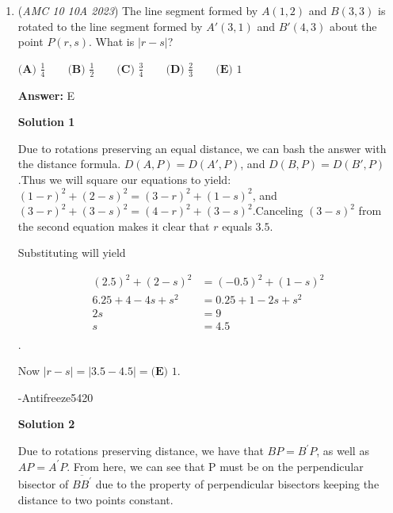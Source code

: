\begin{enumerate}
\textbf{Solution 7 (Dual)}

Note that a rhombic dodecahedron is the dual of a cuboctahedron. A cuboctahedron has $8$ triangular faces, which correspond to $\boxed{\textbf{(D) }8}$ vertices on a rhombic dodecahedron that have $3$ edges.

 



\textbf{Solution 8 (Uses Solution 2)}

Continue through solution 2 until you get $3x+4y=48$. Then we have that $3x = 48-4y = 4(12-y) = \text{multiple of 4}$ so $x$ is a multiple of $4.$ The only multiple of 4 answer choice is $8 = \boxed{(D)}$



	\item (\textit{AMC 10 10A 2023}) The line segment formed by $A(1, 2)$ and $B(3, 3)$ is rotated to the line segment formed by $A'(3, 1)$ and $B'(4, 3)$ about the point $P(r, s)$. What is $|r-s|$?


 $\textbf{(A) } \frac{1}{4} \qquad \textbf{(B) } \frac{1}{2} \qquad \textbf{(C) } \frac{3}{4}   \qquad \textbf{(D) } \frac{2}{3} \qquad   \textbf{(E) } 1$

 \textbf{Answer: }E



\textbf{Solution 1}

Due to rotations preserving an equal distance, we can bash the answer with the distance formula. $D(A, P) = D(A', P)$, and $D(B, P) = D(B',P)$.Thus we will square our equations to yield: $(1-r)^2+(2-s)^2=(3-r)^2+(1-s)^2$, and $(3-r)^2+(3-s)^2=(4-r)^2+(3-s)^2$.Canceling $(3-s)^2$ from the second equation makes it clear that $r$ equals $3.5$.

 Substituting will yield 

 
 \begin{align*}(2.5)^2+(2-s)^2 &= (-0.5)^2+(1-s)^2 \\ 6.25+4-4s+s^2 &= 0.25+1-2s+s^2 \\ 2s &= 9 \\ s &=4.5 \\ \end{align*}
.

 Now $|r-s| = |3.5-4.5| = \boxed{\textbf{(E) } 1}$.

 -Antifreeze5420

 



\textbf{Solution 2}

Due to rotations preserving distance, we have that $BP = B^\prime P$, as well as $AP = A^\prime P$. From here, we can see that P must be on the perpendicular bisector of $\overline{BB^\prime}$ due to the property of perpendicular bisectors keeping the distance to two points constant.


\end{enumerate}

